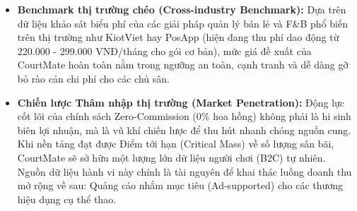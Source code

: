 \begin{itemize}
    \item \textbf{Benchmark thị trường chéo (Cross-industry Benchmark):} Dựa trên dữ liệu khảo sát biểu phí của các giải pháp quản lý bán lẻ và F\&B phổ biến trên thị trường như KiotViet hay PosApp (hiện đang thu phí dao động từ 220.000 - 299.000 VNĐ/tháng cho gói cơ bản), mức giá đề xuất của CourtMate hoàn toàn nằm trong ngưỡng an toàn, cạnh tranh và dễ dàng gỡ bỏ rào cản chi phí cho các chủ sân.
    \item \textbf{Chiến lược Thâm nhập thị trường (Market Penetration):} Động lực cốt lõi của chính sách Zero-Commission (0\% hoa hồng) không phải là hi sinh biên lợi nhuận, mà là vũ khí chiến lược để thu hút nhanh chóng nguồn cung. Khi nền tảng đạt được Điểm tới hạn (Critical Mass) về số lượng sân bãi, CourtMate sẽ sở hữu một lượng lớn dữ liệu người chơi (B2C) tự nhiên. Nguồn dữ liệu hành vi này chính là tài nguyên để khai thác luồng doanh thu mở rộng về sau: Quảng cáo nhắm mục tiêu (Ad-supported) cho các thương hiệu dụng cụ thể thao.
\end{itemize}
